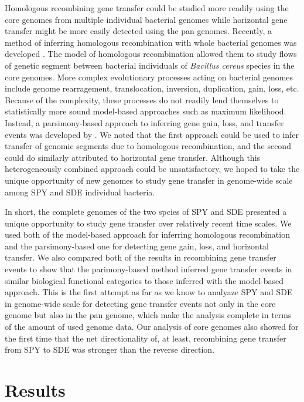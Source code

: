 \documentclass[english]{article}
\begin{document}
Homologous recombining gene transfer could be studied more readily using the
core genomes from multiple individual bacterial genomes while horizontal gene
transfer might be more easily detected using the pan genomes. Recently, a method
of inferring homologous recombination with whole bacterial genomes was developed
\citep{Didelot2010}. The model of homologous recombination allowed them to study
flows of genetic segment between bacterial individuals of \textit{Bacillus
cereus} species in the core genomes.  More complex evolutionary processes acting
on bacterial genomes include genome rearragement, translocation, inversion,
duplication, gain, loss, etc.  Because of the complexity, these processes do not
readily lend themselves to statistically more sound model-based approaches such
as maximum likelihood. Instead, a parsimony-based approach to inferring gene
gain, loss, and transfer events was developed by  \citep{Doyon2011}.  We noted
that the first approach could be used to infer transfer of genomic segments due
to homologous recombination, and the second could do similarly attributed to
horizontal gene transfer. Although this heterogeneously combined approach could
be unsatisfactory, we hoped to take the unique opportunity of new genomes to
study gene transfer in genome-wide scale among SPY and SDE individual bacteria.

In short, the complete genomes of the two spcies of SPY and SDE presented a unique
opportunity to study gene transfer over relatively recent time scales.  We used
both of the model-based approach for inferring homologous recombination and the
parsimony-based one for detecting gene gain, loss, and horizontal transfer. We
also compared both of the results in recombining gene transfer events to show
that the parimony-based method inferred gene transfer events in similar
biological functional categories to those inferred with the model-based
approach. This is the first attempt as far as we know to analyaze SPY and SDE in
genome-wide scale for detecting gene transfer events not only in the core genome
but also in the pan genome, which make the analysis complete in terms of the
amount of used genome data. Our analysis of core genomes also showed for the
first time that the net directionality of, at least, recombining gene transfer
from SPY to SDE was stronger than the reverse direction.

\clearpage{}

\section{Results}
\end{document}
